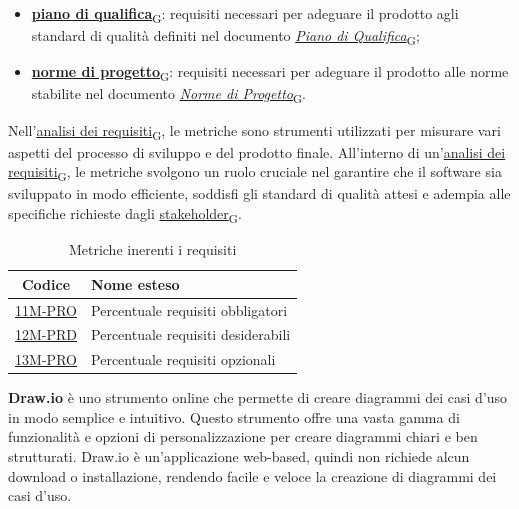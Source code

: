 \begin{enumerate}
\begin{itemize}
		      \item \href{https://7last.github.io/docs/rtb/documentazione-interna/glossario\#piano-di-qualifica}{\textbf{piano di qualifica}\textsubscript{G}}: requisiti necessari per adeguare il prodotto agli standard di qualità definiti nel documento \href{https://7last.github.io/docs/rtb/documentazione-interna/glossario\#piano-di-qualifica}{\textit{Piano di Qualifica}\textsubscript{G}};
		      \item \href{https://7last.github.io/docs/rtb/documentazione-interna/glossario\#norme-di-progetto}{\textbf{norme di progetto}\textsubscript{G}}: requisiti necessari per adeguare il prodotto alle norme stabilite nel documento \href{https://7last.github.io/docs/rtb/documentazione-interna/glossario\#norme-di-progetto}{\textit{Norme di Progetto}\textsubscript{G}}.
	      \end{itemize}
\end{enumerate}

Nell'\href{https://7last.github.io/docs/rtb/documentazione-interna/glossario\#analisi-dei-requisiti}{analisi dei requisiti\textsubscript{G}}, le metriche sono strumenti utilizzati per misurare vari aspetti del processo di sviluppo e del prodotto finale. All'interno di un'\href{https://7last.github.io/docs/rtb/documentazione-interna/glossario\#analisi-dei-requisiti}{analisi dei requisiti\textsubscript{G}}, le metriche svolgono un ruolo cruciale nel garantire che il software sia sviluppato in modo efficiente, soddisfi gli standard di qualità attesi e adempia alle specifiche richieste dagli \href{https://7last.github.io/docs/rtb/documentazione-interna/glossario\#stakeholder}{stakeholder\textsubscript{G}}.
\begin{table}[!h]
	\centering
	\begin{tabular}{ | c | l | }
		\hline
		\textbf{Codice}                      & \textbf{Nome esteso}               \\
		\hline
		\underline{\hyperlink{11M}{11M-PRO}} & Percentuale requisiti obbligatori  \\
		\underline{\hyperlink{12M}{12M-PRD}} & Percentuale requisiti desiderabili \\
		\underline{\hyperlink{13M}{13M-PRO}} & Percentuale requisiti opzionali    \\
		\hline
	\end{tabular}
	\caption{Metriche inerenti i requisiti}
\end{table}

\textbf{Draw.io} è uno strumento online che permette di creare diagrammi dei casi d'uso in modo semplice e intuitivo. Questo strumento offre una vasta gamma di funzionalità e opzioni di personalizzazione per creare diagrammi chiari e ben strutturati. Draw.io è un'applicazione web-based, quindi non richiede alcun download o installazione, rendendo facile e veloce la creazione di diagrammi dei casi d'uso.


